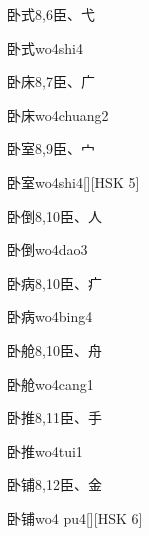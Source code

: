 \begin{Entry}{卧式}{8,6}{⾂、⼷}
  \begin{Phonetics}{卧式}{wo4shi4}
  \end{Phonetics}
\end{Entry}

\begin{Entry}{卧床}{8,7}{⾂、⼴}
  \begin{Phonetics}{卧床}{wo4chuang2}
  \end{Phonetics}
\end{Entry}

\begin{Entry}{卧室}{8,9}{⾂、⼧}
  \begin{Phonetics}{卧室}{wo4shi4}[][HSK 5]
  \end{Phonetics}
\end{Entry}

\begin{Entry}{卧倒}{8,10}{⾂、⼈}
  \begin{Phonetics}{卧倒}{wo4dao3}
  \end{Phonetics}
\end{Entry}

\begin{Entry}{卧病}{8,10}{⾂、⽧}
  \begin{Phonetics}{卧病}{wo4bing4}
  \end{Phonetics}
\end{Entry}

\begin{Entry}{卧舱}{8,10}{⾂、⾈}
  \begin{Phonetics}{卧舱}{wo4cang1}
  \end{Phonetics}
\end{Entry}

\begin{Entry}{卧推}{8,11}{⾂、⼿}
  \begin{Phonetics}{卧推}{wo4tui1}
  \end{Phonetics}
\end{Entry}

\begin{Entry}{卧铺}{8,12}{⾂、⾦}
  \begin{Phonetics}{卧铺}{wo4 pu4}[][HSK 6]
  \end{Phonetics}
\end{Entry}


